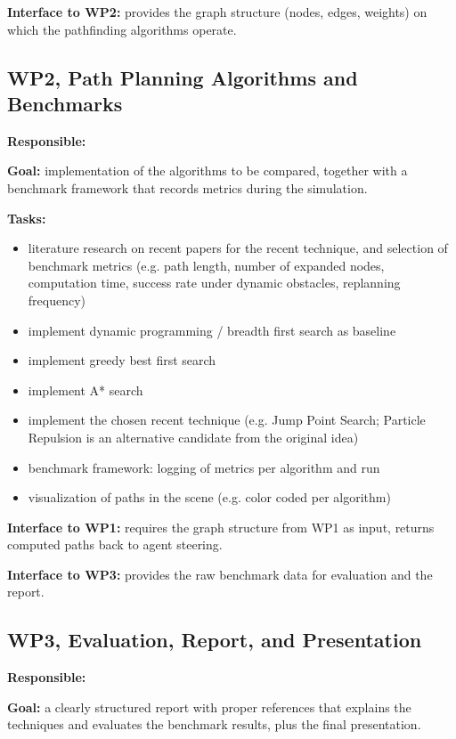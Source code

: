\documentclass[11pt,a4paper]{article}
\begin{document}
\textbf{Interface to WP2:} provides the graph structure (nodes, edges,
weights) on which the pathfinding algorithms operate.

\subsection*{WP2, Path Planning Algorithms and Benchmarks}

\textbf{Responsible:} \underline{\hspace{4cm}}

\textbf{Goal:} implementation of the algorithms to be compared, together
with a benchmark framework that records metrics during the simulation.

\textbf{Tasks:}
\begin{itemize}[leftmargin=1.2em]
  \item literature research on recent papers for the recent technique, and
  selection of benchmark metrics (e.g. path length, number of expanded
  nodes, computation time, success rate under dynamic obstacles,
  replanning frequency)
  \item implement dynamic programming / breadth first search as baseline
  \item implement greedy best first search
  \item implement A* search
  \item implement the chosen recent technique (e.g. Jump Point Search;
  Particle Repulsion is an alternative candidate from the original idea)
  \item benchmark framework: logging of metrics per algorithm and run
  \item visualization of paths in the scene (e.g. color coded per
  algorithm)
\end{itemize}

\textbf{Interface to WP1:} requires the graph structure from WP1 as input,
returns computed paths back to agent steering.

\textbf{Interface to WP3:} provides the raw benchmark data for evaluation
and the report.

\subsection*{WP3, Evaluation, Report, and Presentation}

\textbf{Responsible:} \underline{\hspace{4cm}}

\textbf{Goal:} a clearly structured report with proper references that
explains the techniques and evaluates the benchmark results, plus the
final presentation.
\end{document}
